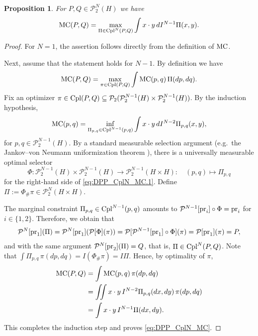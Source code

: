 \documentclass[a4paper]{amsart}
\numberwithin{theorem}{section}
\newtheorem{proposition}[theorem]{Proposition}
\theoremstyle{definition}
\newcommand{\pr}{\textup{pr}}
\newcommand{\cpl}{\textup{Cpl}}
\newcommand{\Pc}{\mathcal P}
\renewcommand{\subset}{\subseteq}
\renewcommand{\H}{H}
\newcommand{\mc}{\textup{MC}}
\begin{document}
\begin{proposition}\label{prop:DPP_CplN_MC}
    For $P, Q \in \Pc_2^N(\H)$ we have 
    \begin{equation}
        \label{eq:DPP_CplN_MC}
        \mc(P,Q) = \max_{ \Pi \in \cpl^N(P,Q) } \int x \cdot y \, d I^{N-1} \Pi (x,y).
    \end{equation}
\end{proposition}
\begin{proof}
    For $N=1$, the assertion follows directly from the definition of $\mc$.
    
    Next, assume that the statement holds for $N-1$. 
    By definition we have
    \[
        \mc(P,Q) = \max_{\pi \in \cpl(P,Q)} \int \mc(p,q) \, \Pi(dp,dq).
    \]
    Fix an optimizer $\pi \in \cpl(P,Q) \subset \Pc_2( \Pc_2^{N-1}(\H) \times \Pc_2^{N-1}(\H))$. 
    By the induction hypothesis,
    \begin{equation}
        \label{eq:DPP_CplN_MC.1}
        \mc(p,q) = \inf_{\Pi_{p,q} \in \cpl^{N-1}(p,q)} \int x \cdot y \, dI^{N-2}\Pi_{p,q}(x,y),
    \end{equation}
    for $p,q \in \Pc_2^{N-1}(\H)$.
    By a standard measurable selection argument (e.g.\ the Jankov--von Neumann uniformization theorem \cite[Theorem 18.1]{Ke95}), there is a universally measurable optimal selector 
    \[
    \Phi : \Pc_2^{N-1}(\H) \times \Pc_2^{N-1}(\H) \to \Pc_2^{N-1}(\H \times \H) :\quad (p,q) \mapsto \Pi_{p,q}
    \]
    for the right-hand side of \eqref{eq:DPP_CplN_MC.1}.
    Define $\Pi := \Phi_\# \pi \in \Pc_2^N(\H \times \H)$. 
    
    The marginal constraint $\Pi_{p,q} \in \cpl^{N-1}(p,q)$ amounts to $\Pc^{N-1}[\pr_i] \circ \Phi = \pr_i$ for $i \in \{1,2\}$.
    Therefore, we obtain that
    \begin{align*}
        \Pc^N[\pr_1](\Pi) = \Pc^N[\pr_1]( \Pc[\Phi](\pi)) = \Pc[  \Pc^{N-1}[\pr_1] \circ \Phi ](\pi) = \Pc[ \pr_1 ](\pi) = P,
    \end{align*}
    and with the same argument $\Pc^N[\pr_2](\Pi) = Q$, that is, $\Pi \in \cpl^N(P,Q)$.
    Note that $\int \Pi_{p,q} \, \pi(dp,dq) = I ( \Phi_\# \pi ) = I \Pi$.
    Hence, by optimality of $\pi$,
    \begin{align*}
        \mc(P,Q) &= \int \mc(p,q) \, \pi(dp,dq)
        \\
        &= \iint x \cdot y \, I^{N-2}\Pi_{p,q}(dx,dy) \, \pi(dp,dq) \\
        &= \int x \cdot y \, I^{N-1}\Pi(dx,dy).
    \end{align*}
    This completes the induction step and proves \eqref{eq:DPP_CplN_MC}.
\end{proof}
\end{document}
